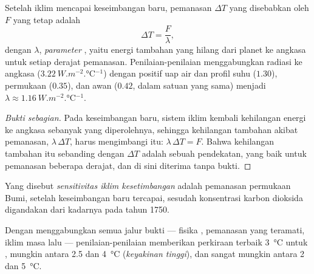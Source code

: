 \begin{proposition}\label{prop:g12:climate-change:equilibrium}
Setelah iklim mencapai keseimbangan baru, pemanasan $\Delta T$ yang disebabkan
oleh  $F$ yang tetap adalah
\[
  \Delta T = \frac{F}{\lambda},
\]
dengan $\lambda$, \emph{parameter }, yaitu energi tambahan
yang hilang dari planet ke angkasa untuk setiap derajat pemanasan.
Penilaian-penilaian menggabungkan radiasi ke angkasa
($\qty{3.22}{W.m^{-2}.\degreeCelsius^{-1}}$) dengan  positif uap air
dan profil suhu ($1.30$),  permukaan ($0.35$), dan awan ($0.42$, dalam
satuan yang sama) menjadi $\lambda \approx \qty{1.16}{W.m^{-2}.\degreeCelsius^{-1}}$.
\end{proposition}

\begin{proof}[Bukti sebagian]
Pada keseimbangan baru, sistem iklim kembali kehilangan energi ke angkasa
sebanyak yang diperolehnya, sehingga kehilangan tambahan akibat pemanasan,
$\lambda\,\Delta T$, harus mengimbangi  itu: $\lambda\,\Delta T = F$. Bahwa
kehilangan tambahan itu sebanding dengan $\Delta T$ adalah sebuah pendekatan,
yang baik untuk pemanasan beberapa derajat, dan di sini diterima tanpa bukti.
\end{proof}

\begin{definition}\label{def:g12:climate-change:ecs}
Yang disebut \emph{sensitivitas iklim kesetimbangan}
adalah pemanasan permukaan Bumi, setelah keseimbangan baru tercapai, sesudah
konsentrasi karbon dioksida digandakan dari kadarnya pada tahun 1750.
\end{definition}

\begin{proposition}\label{prop:g12:climate-change:ecs}
Dengan menggabungkan semua jalur bukti --- fisika , pemanasan yang
teramati, iklim masa lalu --- penilaian-penilaian memberikan perkiraan terbaik
\qty{3}{\degreeCelsius} untuk , mungkin antara
2.5 dan \qty{4}{\degreeCelsius} (\emph{keyakinan tinggi}), dan sangat mungkin
antara 2 dan \qty{5}{\degreeCelsius}.
\end{proposition}

